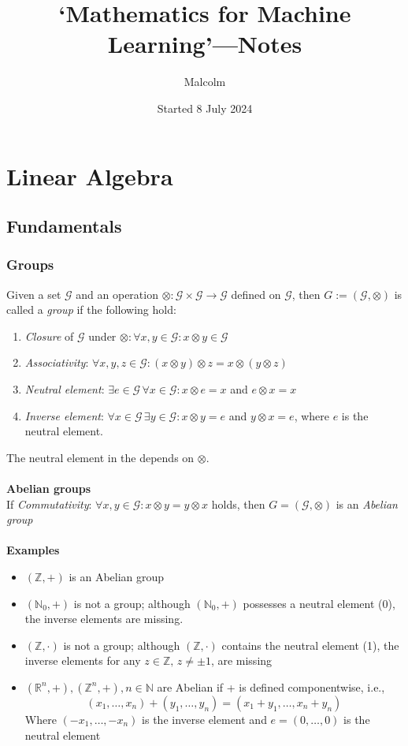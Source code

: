 \documentclass{report}
\title{`Mathematics for Machine Learning'---Notes}
\date{Started 8 July 2024}
\author{Malcolm}
\begin{document}
\maketitle
\tableofcontents

\appendix
\chapter{Linear Algebra}
\section{Fundamentals}
\subsection{Groups}
Given a set $\mathcal{G}$ and an operation $\otimes:\mathcal{G\times G\rightarrow G}$ defined on
$\mathcal{G}$, then $G:=(\mathcal{G},\otimes)$ is called a \textit{group} if the following hold:
\begin{enumerate}
\item \textit{Closure} of $\mathcal{G}$ under $\otimes:
\forall x,y\in\mathcal{G}:x\otimes y
\in\mathcal{G}$
\item\textit{Associativity}: $\forall x,y,z\in\mathcal{G}:(x\otimes y)\otimes z=x\otimes(y\otimes z)$
\item\textit{Neutral element}: $\exists e\in\mathcal{G}\,\forall x\in\mathcal{G}:
x\otimes e=x$ and $e\otimes x=x$
\item\textit{Inverse element}: $\forall x\in\mathcal{G}\,\exists y\in\mathcal{G}:x\otimes y=e$
and $y\otimes x=e$, where $e$ is the neutral element.
\end{enumerate}
The neutral element in the depends on $\otimes$.\\
\vspace{1mm}\\
\textbf{Abelian groups}\\
If \textit{Commutativity}: $\forall x,y\in\mathcal{G}:x\otimes y=y\otimes x$ holds, then 
$G=(\mathcal{G},\otimes)$ is an \textit{Abelian group}\\
\vspace{1mm}\\
\textbf{Examples}
\begin{itemize}
\item$(\mathbb{Z},+)$ is an Abelian group
\item$(\mathbb{N}_0,+)$ is not a group; although $(\mathbb{N}_0,+)$ possesses a neutral
element (0), the inverse elements are missing.
\item$(\mathbb{Z},\cdot)$ is not a group; although $(\mathbb{Z},\cdot)$ contains the neutral element (1),
the inverse elements for any $z\in\mathbb{Z},\,z\neq\pm1$,
are missing
\item$(\mathbb{R}^n,+),(\mathbb{Z}^n,+),n\in\mathbb{N}$ are Abelian if + is defined componentwise, i.e.,
\begin{equation*}
(x_1,\ldots,x_n)+(y_1,\ldots,y_n)=(x_1+y_1,\ldots,x_n+y_n)
\end{equation*}
Where $(-x_1,\ldots,-x_n)$ is the inverse element and $e=(0,\ldots,0)$ is the neutral element
\end{itemize}
\newpage
\end{document}
